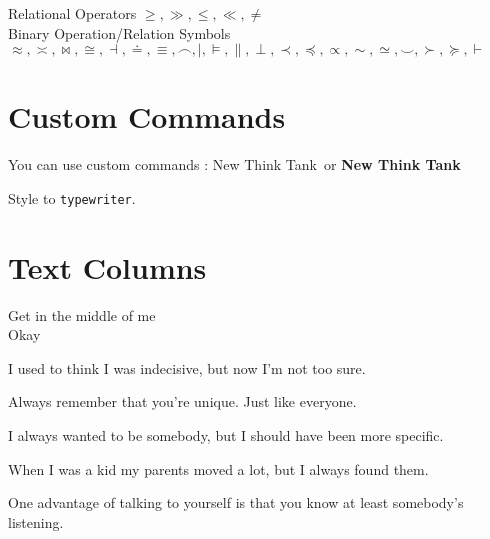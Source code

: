 \documentclass[a4paper,12pt]{book}
\newcommand{\NTT}{New Think Tank}
\newcommand{\NTTB}{\textbf{New Think Tank}}
\newcommand{\typew}[1]{\texttt{#1}}
\begin{document}
 Relational Operators $ \geq, \gg, \leq, \ll, \neq $ \\

Binary Operation/Relation Symbols $ \approx, \asymp, \bowtie, \cong, \dashv, \doteq, 
\equiv, \frown, \mid, \models, \parallel, \perp, \prec, \preceq, \propto, \sim, \simeq, \smile, 
\succ, \succeq, \vdash $ \\


\section{\textsf{Custom Commands}}

You can use custom commands : \NTT\ or \NTTB\

Style to \typew{typewriter}.

\section{\textsf{Text Columns}}

{\centering
Get in the middle of me\\
Okay\\[10pt]
}

\quad\parbox{2cm}{I used to think I was indecisive, but now I'm not too sure.}
\quad\parbox{2cm}{Always re\-mem\-ber that you're unique. Just like everyone.}
\quad\parbox{2cm}{\raggedright I always wanted to be somebody, but I should have been more specific.}
\quad\parbox{2cm}{\raggedleft When I was a kid my parents moved a lot, but I always found them. }

\begin{minipage}{5cm}

One advantage of talking to yourself is that you know at least somebody's listening.

\end{minipage}
\end{document}
